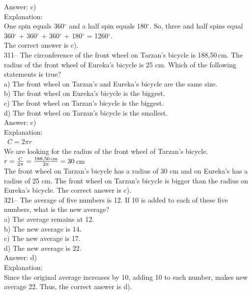 \documentclass[letterpaper, 12pt]{article}
\begin{document}
Answer: c)\\

Explanation: \\
One spin equals 360$^{\circ}$ and a half spin equals 180$^{\circ}$.
So, three and half spins equal 360$^{\circ}$ + 360$^{\circ}$ +
360$^{\circ}$ + 180$^{\circ}$ = 1260$^{\circ}$.\\
The correct answer is c).\\


311-- The circonference of the front wheel on Tarzan's bicycle is
188,50\,cm.  The radius of the front wheel of Eureka's bicycle is
25 cm.  Which of the following statements is true?\\

a) The front wheel on Tarzan's and Eureka's bicycle are the same size.\\
b) The front wheel on Eureka's bicycle is the biggest.\\
c) The front wheel on Tarzan's bicycle is the biggest.\\
d) The front wheel on Tarzan's bicycle is the smallest.\\

Answer: c)\\

Explanation:\\
\
$C=2\pi r$\\[2mm]
We are looking for the radius of the front wheel of Tarzan's bicycle.\\[2mm]
$r=\frac{C}{2\pi}=\frac{188,50\textrm{\,cm}}{2\pi}=30$\,cm\\[2mm]
The front wheel on Tarzan's bicycle has a radius of 30 cm and on Eureka's has a radius of 25 cm.
The front wheel on Tarzan's bicycle is bigger than the radius on Eureka's bicycle.
The correct answer is c).\\



321-- The average of five numbers is 12.  If 10 is added to each of these five numbers, what is the new average?\\

a) The average remains at 12.\\
b) The new average is 14.\\
c) The new average is 17.\\
d) The new average is 22.\\

Answer: d)\\

Explanation:\\
Since the original average increases by 10, adding 10 to each number,  makes new average 22.
Thus, the correct answer is d).\\
\end{document}
